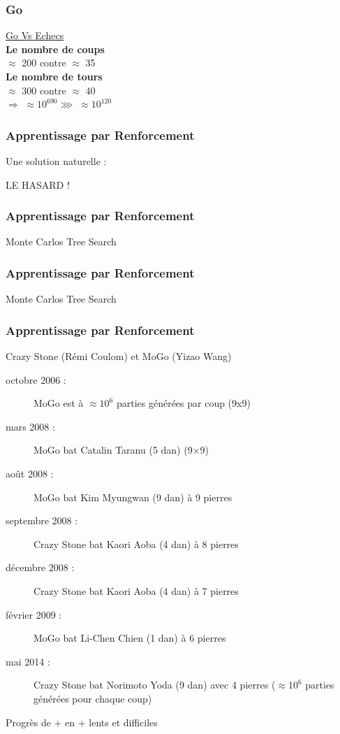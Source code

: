\documentclass{formation}
\begin{document}
\begin{frame}
  \frametitle{Go}
  \begin{minipage}[c]{0.6\linewidth}
  \end{minipage}\hfill
  \begin{minipage}[c]{0.33\linewidth}
    \begin{center}
      \underline{Go Vs Echecs} \\
      \textbf{Le nombre de coups} \\
      $\approx$ 200 contre $\approx$ 35 \\
      \textbf{Le nombre de tours} \\
      $\approx$ 300 contre $\approx$ 40 \\
      $\Rightarrow$ $\approx 10^{690}\ggg \;\approx 10^{120}$
    \end{center}
  \end{minipage}\hfill
\end{frame}

\begin{frame}
  \frametitle{Apprentissage par Renforcement}
  \huge Une solution naturelle :
  \newline
  \begin{center}
  \huge LE HASARD !
  \end{center}
\end{frame}

\begin{frame}
  \frametitle{Apprentissage par Renforcement}
  Monte Carlos Tree Search
\end{frame}

\begin{frame}
  \frametitle{Apprentissage par Renforcement}
  Monte Carlos Tree Search
\end{frame}

\begin{frame}
  \frametitle{Apprentissage par Renforcement}
  Crazy Stone (Rémi Coulom) et MoGo (Yizao Wang)
  \newline
  \begin{description}
  \item[octobre 2006 :] MoGo est à $\approx 10^6$ parties générées par coup (9x9)
  \item[mars 2008 :] MoGo bat Catalin Taranu (5 dan) (9×9)
  \item[août 2008 :] MoGo bat Kim Myungwan (9 dan) à 9 pierres
  \item[septembre 2008 :] Crazy Stone bat Kaori Aoba (4 dan) à 8 pierres
  \item[décembre 2008 :] Crazy Stone bat Kaori Aoba (4 dan) à 7 pierres
  \item[février 2009 :] MoGo bat Li-Chen Chien (1 dan) à 6 pierres
  \item[mai 2014 :] Crazy Stone bat Norimoto Yoda (9 dan) avec 4 pierres ($\approx 10^{6}$ parties générées pour chaque coup)
  \end{description}
  \begin{center}
    Progrès de + en + lents et difficiles
  \end{center}
\end{frame}
\end{document}
